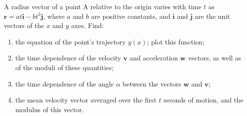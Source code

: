 
\item A radius vector of a point A relative to the origin varies with time \( t \) as \( \mathbf{r} = at\mathbf{i} - bt^3\mathbf{j} \), where \( a \) and \( b \) are positive constants, and \( \mathbf{i} \) and \( \mathbf{j} \) are the unit vectors of the \( x \) and \( y \) axes. Find:
    \begin{enumerate}
        \item the equation of the point's trajectory \( y(x) \); plot this function;
        \item the time dependence of the velocity \( \mathbf{v} \) and acceleration \( \mathbf{w} \) vectors, as well as of the moduli of these quantities;
        \item the time dependence of the angle \( \alpha \) between the vectors \( \mathbf{w} \) and \( \mathbf{v} \);
        \item the mean velocity vector averaged over the first \( t \) seconds of motion, and the modulus of this vector.
    \end{enumerate}
